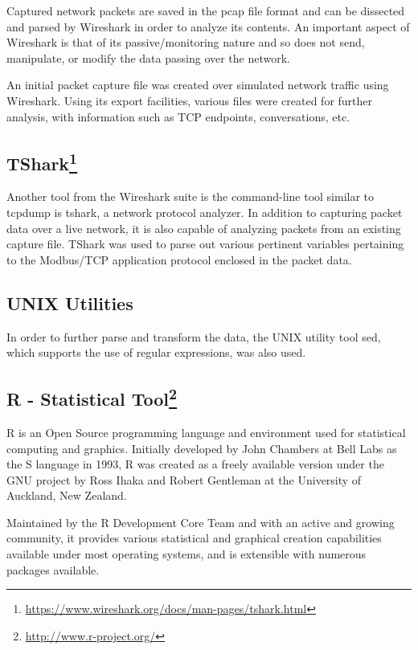 \documentclass[]{article}
\let\rmarkdownfootnote\footnote%
\def\footnote{\protect\rmarkdownfootnote}
\begin{document}
Captured network packets are saved in the pcap file format and can be
dissected and parsed by Wireshark in order to analyze its contents. An
important aspect of Wireshark is that of its passive/monitoring nature
and so does not send, manipulate, or modify the data passing over the
network.

An initial packet capture file was created over simulated network
traffic using Wireshark. Using its export facilities, various files were
created for further analysis, with information such as TCP endpoints,
conversations, etc.

\subsection[TShark]{TShark\footnote{\url{https://www.wireshark.org/docs/man-pages/tshark.html}}}\label{tshark2}

Another tool from the Wireshark suite is the command-line tool similar
to tcpdump is tshark, a network protocol analyzer. In addition to
capturing packet data over a live network, it is also capable of
analyzing packets from an existing capture file. TShark was used to
parse out various pertinent variables pertaining to the Modbus/TCP
application protocol enclosed in the packet data.

\subsection{UNIX Utilities}\label{unix-utilities}

In order to further parse and transform the data, the UNIX utility tool
sed, which supports the use of regular expressions, was also used.

\subsection[R - Statistical Tool]{R - Statistical Tool\footnote{\url{http://www.r-project.org/}}}\label{r---statistical-tool3}

R is an Open Source programming language and environment used for
statistical computing and graphics. Initially developed by John Chambers
at Bell Labs as the S language in 1993, R was created as a freely
available version under the GNU project by Ross Ihaka and Robert
Gentleman at the University of Auckland, New Zealand.

Maintained by the R Development Core Team and with an active and growing
community, it provides various statistical and graphical creation
capabilities available under most operating systems, and is extensible
with numerous packages available.
\end{document}
